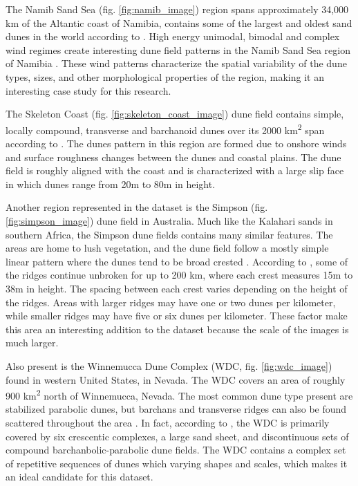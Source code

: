 The Namib Sand Sea (fig. \ref{fig:namib_image}) region spans approximately 34,000 km of the Altantic coast of Namibia, contains some of the largest and oldest sand dunes in the world according to \cite{goodie_namib_sand_sea_ancient_desert}. High energy unimodal, bimodal and complex wind regimes create interesting dune field patterns in the Namib Sand Sea region of Namibia \cite{lancaster_winds_sand_movement_namib_sea}. These wind patterns characterize the spatial variability of the dune types, sizes, and other morphological properties of the region, making it an interesting case study for this research.

The Skeleton Coast (fig. \ref{fig:skeleton_coast_image}) dune field contains simple, locally compound, transverse and barchanoid dunes over its 2000 km\textsuperscript{2} span according to \cite{lancaster_dunes_skeleton_coast}. The dunes pattern in this region are formed due to onshore winds and surface roughness changes between the dunes and coastal plains. The dune field is roughly aligned with the coast and is characterized with a large slip face in which dunes range from 20m to 80m in height.

Another region represented in the dataset is the Simpson (fig. \ref{fig:simpson_image}) dune field in Australia. Much like the Kalahari sands in southern Africa, the Simpson dune fields contains many similar features. The areas are home to lush vegetation, and the dune field follow a mostly simple linear pattern where the dunes tend to be broad crested \cite{hesse_australian_desert_dunefields}. According to \cite{twidale_simpson_desert_australia}, some of the ridges continue unbroken for up to 200 km, where each crest measures 15m to 38m in height. The spacing between each crest varies depending on the height of the ridges. Areas with larger ridges may have one or two dunes per kilometer, while smaller ridges may have five or six dunes per kilometer. These factor make this area an interesting addition to the dataset because the scale of the images is much larger.

Also present is the Winnemucca Dune Complex (WDC, fig. \ref{fig:wdc_image}) found in western United States, in Nevada. The WDC covers an area of roughly 900 km\textsuperscript{2} north of Winnemucca, Nevada. The most common dune type present are stabilized parabolic dunes, but barchans and transverse ridges can also be found scattered throughout the area \cite{zimbelman_eolian_deposits_western_united_states}. In fact, according to \cite{pepe_winnemucca_dune_complex}, the WDC is primarily covered by six crescentic complexes, a large sand sheet, and discontinuous sets of compound barchanbolic-parabolic dune fields. The WDC contains a complex set of repetitive sequences of dunes which varying shapes and scales, which makes it an ideal candidate for this dataset.

